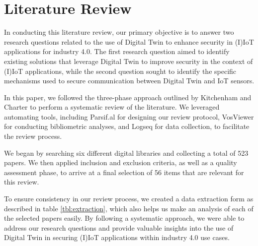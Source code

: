                 

\chapter{Literature Review} 
\label{Chapter3} %
In conducting this literature review, our primary objective is to answer two research questions related to the use of Digital Twin to enhance security in (I)IoT applications for industry 4.0. The first research question aimed to identify existing solutions that leverage Digital Twin to improve security in the context of (I)IoT applications, while the second question sought to identify the specific mechanisms used to secure communication between Digital Twin and IoT sensors.

In this paper, we followed the three-phase approach outlined by Kitchenham and Charter\cite{kitchenham_guidelines_2007} to perform a systematic review of the literature. We leveraged automating tools, including Parsif.al for designing our review protocol, VosViewer for conducting bibliometric analyses, and Logseq for data collection, to facilitate the review process.

We began by searching six different digital libraries and collecting a total of 523 papers. We then applied inclusion and exclusion criteria, as well as a quality assessment phase, to arrive at a final selection of 56 items that are relevant for this review.

To ensure consistency in our review process, we created a data extraction form as described in table \ref{tbl:extraction}, which also helps us make an analysis of each of the selected papers easily. By following a systematic approach, we were able to address our research questions and provide valuable insights into the use of Digital Twin in securing (I)IoT applications within industry 4.0 use cases.










